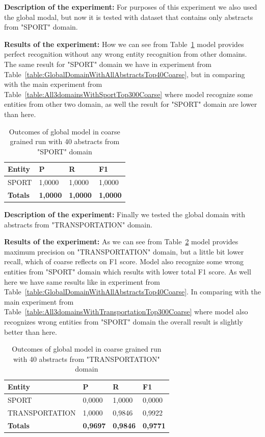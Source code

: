 \documentclass[thesis=M,english]{FITthesis}[2018/05/30]
\begin{document}
	\textbf{Description of the experiment:} For purposes of this experiment we also used the global modal, but now it is tested with dataset that contains only abstracts from "SPORT" domain.   

	\textbf{Results of the experiment:} How we can see from Table~\ref{table:GlobalDomainWithSportTop40Coarse} model provides perfect recognition without any wrong entity recognition from other domains. The same result for "SPORT" domain we have in experiment from Table~\ref{table:GlobalDomainWithAllAbstractsTop40Coarse}, but in comparing with the main experiment from Table~\ref{table:All3domainsWithSportTop300Coarse} where model recognize some entities from other two domain, as well the result for "SPORT" domain are lower than here. 

	\begin{table}[H]\centering
		\begin{tabular}{|l|l|l|l|}
			\hline {\textbf{Entity}} & {\textbf{P}} & {\textbf{R}} & {\textbf{F1}}\\\hline
				SPORT & 1,0000 & 1,0000 & 1,0000\\\hline
				\textbf{Totals} & \textbf{1,0000} & \textbf{1,0000} & \textbf{1,0000}\\\hline
		\end{tabular}
		\caption{Outcomes of global model in coarse grained run with 40 abstracts from "SPORT" domain \label{table:GlobalDomainWithSportTop40Coarse}}
	\end{table}	


	\textbf{Description of the experiment:} Finally we tested the global domain with abstracts from "TRANSPORTATION" domain.

	\textbf{Results of the experiment:} As we can see from Table~\ref{table:GlobalDomainWithTransportationTop40Coarse} model provides maximum precision on "TRANSPORTATION" domain, but a little bit lower recall, which of coarse reflects on F1 score. Model also recognize some wrong entities from "SPORT" domain which results with lower total F1 score. As well here we have same results like in experiment from Table~\ref{table:GlobalDomainWithAllAbstractsTop40Coarse}. In comparing with the main experiment from Table~\ref{table:All3domainsWithTransportationTop300Coarse} where model also recognizes wrong entities from "SPORT" domain the overall result is slightly better than here.

	\begin{table}[H]\centering
		\begin{tabular}{|l|l|l|l|}
			\hline {\textbf{Entity}} & {\textbf{P}} & {\textbf{R}} & {\textbf{F1}}\\\hline
				SPORT & 0,0000 & 1,0000 & 0,0000\\
				TRANSPORTATION & 1,0000 & 0,9846 & 0,9922\\\hline
				\textbf{Totals} & \textbf{0,9697} & \textbf{0,9846} & \textbf{0,9771}\\\hline
		\end{tabular}
		\caption{Outcomes of global model in coarse grained run with 40 abstracts from "TRANSPORTATION" domain \label{table:GlobalDomainWithTransportationTop40Coarse}}
	\end{table}	
		
\end{document}
